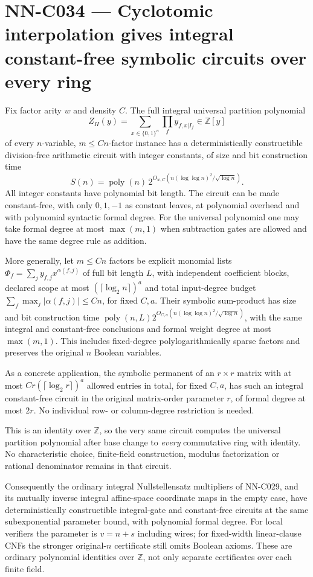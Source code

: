 \section{NN-C034 --- Cyclotomic interpolation gives integral constant-free symbolic circuits over every ring}
\begin{proposition}[NN-C034]
Fix factor arity $w$ and density $C$. The full integral universal partition polynomial
\[
 Z_H(y)=\sum_{x\in\{0,1\}^n}\prod_f y_{f,x|I_f}
                              \in\mathbb Z[y]
\]
of every $n$-variable, $m\leq Cn$-factor instance has a deterministically constructible division-free arithmetic circuit with integer constants, of size and bit construction time
\[
 S(n)=\operatorname{poly}(n)\,
       2^{O_{w,C}(n(\log\log n)^2/\sqrt{\log n})}.
\]
All integer constants have polynomial bit length. The circuit can be made constant-free, with only $0,1,-1$ as constant leaves, at polynomial overhead and with polynomial syntactic formal degree. For the universal polynomial one may take formal degree at most $\max(m,1)$ when subtraction gates are allowed and have the same degree rule as addition.

More generally, let $m\leq Cn$ factors be explicit monomial lists $\Phi_f=\sum_j y_{f,j}x^{\alpha(f,j)}$ of full bit length $L$, with independent coefficient blocks, declared scope at most $(\lceil\log_2n\rceil)^a$ and total input-degree budget $\sum_f\max_j|\alpha(f,j)|\leq Cn$, for fixed $C,a$. Their symbolic sum-product has size and bit construction time $\operatorname{poly}(n,L)2^{O_{C,a}(n(\log\log n)^2/\sqrt{\log n})}$, with the same integral and constant-free conclusions and formal weight degree at most $\max(m,1)$. This includes fixed-degree polylogarithmically sparse factors and preserves the original $n$ Boolean variables.

As a concrete application, the symbolic permanent of an $r\times r$ matrix with at most $Cr(\lceil\log_2r\rceil)^a$ allowed entries in total, for fixed $C,a$, has such an integral constant-free circuit in the original matrix-order parameter $r$, of formal degree at most $2r$. No individual row- or column-degree restriction is needed.

This is an identity over $\mathbb Z$, so the very same circuit computes the universal partition polynomial after base change to \emph{every} commutative ring with identity. No characteristic choice, finite-field construction, modulus factorization or rational denominator remains in that circuit.

Consequently the ordinary integral Nullstellensatz multipliers of NN-C029, and its mutually inverse integral affine-space coordinate maps in the empty case, have deterministically constructible integral-gate and constant-free circuits at the same subexponential parameter bound, with polynomial formal degree. For local verifiers the parameter is $v=n+s$ including wires; for fixed-width linear-clause CNFs the stronger original-$n$ certificate still omits Boolean axioms. These are ordinary polynomial identities over $\mathbb Z$, not only separate certificates over each finite field.


\end{proposition}
